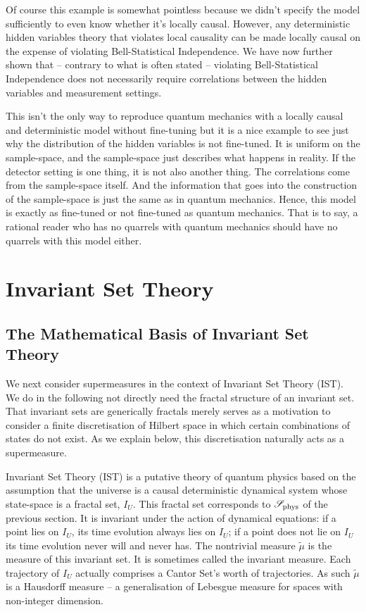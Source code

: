 \documentclass[12pt]{article}
\begin{document}
Of course this example is somewhat pointless because we didn't specify the model sufficiently to even know whether it's locally causal. However, any deterministic hidden variables theory that violates local causality can be made locally causal on the expense of violating Bell-Statistical Independence. We have now further shown that -- contrary to what is often stated -- violating Bell-Statistical Independence does not necessarily require correlations between the hidden variables and measurement settings.

This isn't the only way to reproduce quantum mechanics with a locally causal and deterministic model without fine-tuning \cite{Donadi2020SuperdetToy} but it is a nice example to see just why the distribution of the hidden variables is not fine-tuned. It is uniform on the sample-space, and the sample-space just describes what happens in reality. If the detector setting is one thing, it is not also another thing. The correlations come from the sample-space itself. And the information that goes into the construction of the sample-space is just the same as in quantum mechanics. Hence, this model is exactly as fine-tuned or not fine-tuned as quantum mechanics. That is to say, a rational reader who has no quarrels with quantum mechanics should have no quarrels with this model either.


\section{Invariant Set Theory}
\label{IST}


\subsection{The Mathematical Basis of Invariant Set Theory}
\label{istmath}

We next consider supermeasures in the context of Invariant Set Theory ({\sc IST}). We do in the following not directly need the fractal structure of an invariant set. That invariant sets are generically fractals merely serves as a motivation to consider a finite discretisation of Hilbert space in which certain combinations of states do not exist. As we explain below, this discretisation naturally acts as a supermeasure.

Invariant Set Theory ({\sc IST}) \cite{Palmer2020Discretization,Palmer1995Spin,Palmer2009ISP} is a putative theory of quantum physics based on the assumption that the universe is a causal deterministic dynamical system whose state-space is a fractal set, $I_U$. This fractal set corresponds to ${\mathscr S}_{\rm phys}$ of the previous section. It is invariant under the action of dynamical equations: if a point lies on $I_U$, its time evolution always lies on $I_U$; if a point does not lie on $I_U$ its time evolution never will and never has. The nontrivial measure $\tilde \mu$ is the measure of this invariant set. It is sometimes called the invariant measure. Each trajectory of $I_U$ actually comprises a Cantor Set's worth of trajectories. As such $\tilde \mu$ is a Hausdorff measure \cite{Rogers1998Hausdorff} -- a generalisation of Lebesgue measure for spaces with non-integer dimension. 
\end{document}
